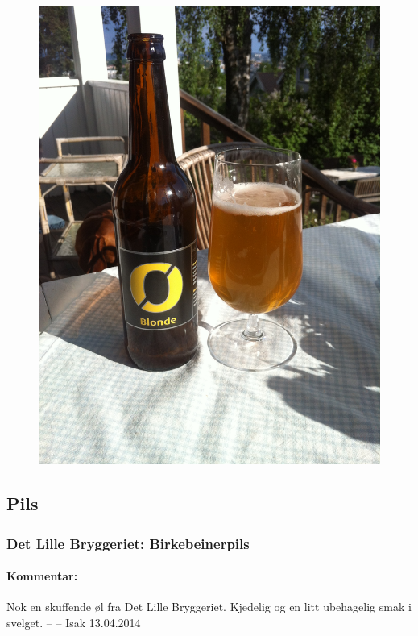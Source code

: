 \documentclass[12pt,a4paper,oneside,norsk]{article}
\begin{document}
\begin{figure} [H]
\centering
\includegraphics[scale=0.1, angle=270]{Bilder/Ol/nogneblonde}
\end{figure}

\newpage
\subsection{Pils}

\subsubsection{Det Lille Bryggeriet: Birkebeinerpils}
\paragraph{Kommentar:}Nok en skuffende øl fra Det Lille Bryggeriet. Kjedelig og en litt ubehagelig smak i svelget. 
\newline
-- -- Isak 13.04.2014
\end{document}
